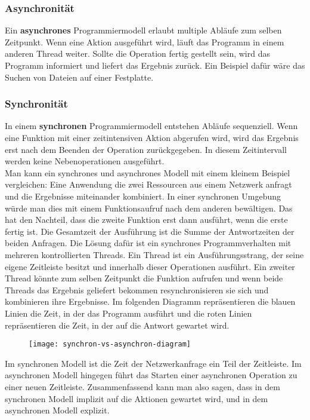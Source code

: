 \subsubsection{Asynchronität}

Ein \textbf{asynchrones} Programmiermodell erlaubt multiple Abläufe zum selben Zeitpunkt. Wenn eine Aktion ausgeführt wird, läuft das Programm in einem anderen \glqq Thread\grqq{} weiter. Sollte die Operation fertig gestellt sein, wird das Programm informiert und liefert das Ergebnis zurück. Ein Beispiel dafür wäre das Suchen von Dateien auf einer Festplatte.\cite{asynchronitaet}

\subsubsection{Synchronität}

In einem \textbf{synchronen} Programmiermodell entstehen Abläufe sequenziell. Wenn eine Funktion mit einer zeitintensiven Aktion abgerufen wird, wird das Ergebnis erst nach dem Beenden der Operation zurückgegeben. In diesem Zeitintervall werden keine Nebenoperationen ausgeführt.\cite{asynchronitaet}\\

\noindent
Man kann ein synchrones und asynchrones Modell mit einem kleinem Beispiel vergleichen: Eine Anwendung die zwei Ressourcen aus einem Netzwerk anfragt und die Ergebnisse miteinander kombiniert. In einer synchronen Umgebung würde man dies mit einem Funktionsaufruf nach dem anderen bewältigen. Das hat den Nachteil, dass die zweite Funktion erst dann ausführt, wenn die erste fertig ist. Die Gesamtzeit der Ausführung ist die Summe der Antwortzeiten der beiden Anfragen. Die Lösung dafür ist ein synchrones Programmverhalten mit mehreren kontrollierten Threads. Ein Thread ist ein Ausführungsstrang, der seine eigene Zeitleiste besitzt und innerhalb dieser Operationen ausführt. Ein zweiter Thread könnte zum selben Zeitpunkt die Funktion aufrufen und wenn beide Threads das Ergebnis geliefert bekommen resynchronisieren sie sich und kombinieren ihre Ergebnisse. Im folgenden Diagramm repräsentieren die blauen Linien die Zeit, in der das Programm ausführt und die roten Linien repräsentieren die Zeit, in der auf die Antwort gewartet wird.\cite{asynchronitaet}

\begin{center}
\begin{figure}[H]
\texttt{[image: synchron-vs-asynchron-diagram]}
\end{figure}
\end{center}

\noindent
Im synchronen Modell ist die Zeit der Netzwerkanfrage ein Teil der Zeitleiste. Im asynchronen Modell hingegen führt das Starten einer asynchronen Operation zu einer neuen Zeitleiste. Zusammenfassend kann man also sagen, dass in dem synchronen Modell implizit auf die Aktionen gewartet wird, und in dem asynchronen Modell explizit.